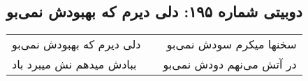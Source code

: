 \begin{center}
\section*{دوبیتی شماره ۱۹۵: دلی دیرم که بهبودش نمی‌بو}
\label{sec:195}
\begin{longtable}{l p{0.5cm} r}
دلی دیرم که بهبودش نمی‌بو
&&
سخنها میکرم سودش نمی‌بو
\\
ببادش میدهم نش میبرد باد
&&
در آتش می‌نهم دودش نمی‌بو
\\
\end{longtable}
\end{center}
